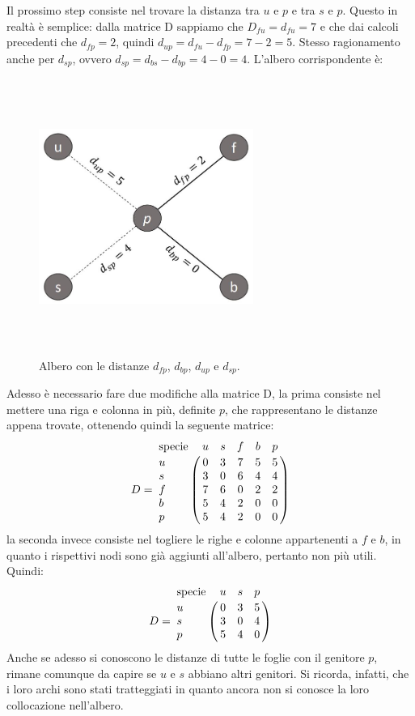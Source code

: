 \newline
Il prossimo step consiste nel trovare la distanza tra $u$ e $p$ e tra $s$ e $p$. Questo in realtà è semplice: dalla matrice D sappiamo che $D_{fu}=d_{fu}=7$ e che dai calcoli precedenti che $d_{fp}=2$, quindi $d_{up}=d_{fu}-d_{fp}=7-2=5$. Stesso ragionamento anche per $d_{sp}$, ovvero $d_{sp}=d_{bs}-d_{bp}=4-0=4$.
\newline
L'albero corrispondente è:
\newpage
\begin{figure}[h!]
\centering
	\includegraphics[height=9cm, width=7cm, keepaspectratio]{distance_between_f_b_part_4.jpg}
 	\caption{Albero con le distanze $d_{fp}$, $d_{bp}$, $d_{up}$ e $d_{sp}$.}
  	\label{fig:neighborsleaves_3}
\end{figure}
Adesso è necessario fare due modifiche alla matrice D, la prima consiste nel mettere una riga e colonna in più, definite $p$, che rappresentano le distanze appena trovate, ottenendo quindi la seguente matrice:
\[
D = \bordermatrix{\text{specie}&u&s&f&b&p\cr
                u& 0 & 3 & 7 & 5 & 5\cr
                s& 3 & 0 & 6 & 4 & 4\cr
                f& 7 & 6 & 0 & 2 & 2\cr
                b& 5 & 4 & 2 & 0 & 0\cr
                p&  5 & 4 & 2 & 0 & 0}
\]
la seconda invece consiste nel togliere le righe e colonne appartenenti a $f$ e $b$, in quanto i rispettivi nodi sono già aggiunti all'albero, pertanto non più utili. Quindi:
\[
D = \bordermatrix{\text{specie}&u&s&p\cr
                u& 0 & 3 & 5\cr
                s& 3 & 0 & 4\cr
                p&  5 & 4 & 0}
\]
Anche se adesso si conoscono le distanze di tutte le foglie con il genitore $p$, rimane comunque da capire se $u$ e $s$ abbiano altri genitori. Si ricorda, infatti, che i loro archi sono stati tratteggiati in quanto ancora non si conosce la loro collocazione nell'albero.
